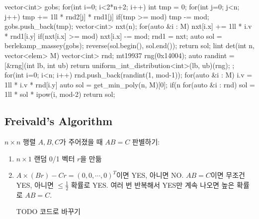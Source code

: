 \begin{cpp}
{{  }
  vector<int> gobs;
  for(int i=0; i<2*n+2; i++){
    int tmp = 0;
    for(int j=0; j<n; j++){
      tmp += 1ll * rnd2[j] * rnd1[j] %
      if(tmp >= mod) tmp -= mod;
    }
    gobs.push_back(tmp);
    vector<int> nxt(n);
    for(auto &i : M){
      nxt[i.x] += 1ll * i.v * rnd1[i.y] %
      if(nxt[i.x] >= mod) nxt[i.x] -= mod;
    }
    rnd1 = nxt;
  }
  auto sol = berlekamp_massey(gobs);
  reverse(sol.begin(), sol.end());
  return sol;
}
lint det(int n, vector<elem> M){
  vector<int> rnd;
  mt19937 rng(0x14004);
  auto randint = [&rng](int lb, int ub){
    return uniform_int_distribution<int>(lb, ub)(rng);
  };
  for(int i=0; i<n; i++) rnd.push_back(randint(1, mod-1));
  for(auto &i : M){
    i.v = 1ll * i.v * rnd[i.y] %
  }
  auto sol = get_min_poly(n, M)[0];
  if(n %
  for(auto &i : rnd) sol = 1ll * sol * ipow(i, mod-2)%
  return sol;
}
\end{cpp}

\subsection{Freivald's Algorithm}
$n \times n$ 행렬 $A,B,C$가 주어졌을 때 $AB = C$ 판별하기:\begin{enumerate}
    \item $n \times 1$ 랜덤 0/1 벡터 $r$을 만듦
    \item $A \times (Br) - Cr = (0,0,\cdots,0)^T$이면 YES, 아니면 NO.
$AB = C$이면 무조건 YES, 아니면 $\leq \frac{1}{2}$ 확률로 YES. 여러 번 반복해서 YES만 계속 나오면 높은 확률로 $AB = C$.

TODO 코드로 바꾸기
\end{enumerate}